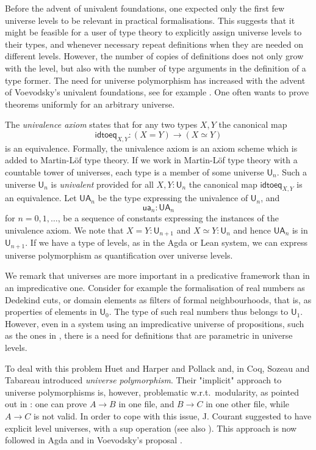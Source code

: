 \documentclass[11pt,a4paper]{article}
\theoremstyle{definition}
\newcommand{\UU}{\mathsf{U}}
\newcommand{\Level}{\mathsf{Level}}
\newcommand{\idtoeq}{\mathsf{idtoeq}}
\newcommand{\ua}{\mathsf{ua}}
\newcommand{\UA}{\mathsf{UA}}
\begin{document}
Before the advent of univalent foundations, one expected only the first few universe
levels to be relevant in practical formalisations. This suggests that it might be feasible
for a user of type theory to explicitly assign universe levels to their types, and whenever necessary
repeat definitions when they are needed on different levels. However, the number of copies of definitions
does not only grow with the level, but also with the number of type arguments in the definition of a type former.
The need for universe polymorphism has increased with the advent of Voevodsky's univalent foundations,
see for example \cite{VV}. One often wants to prove theorems uniformly for an arbitrary universe.

The {\em univalence axiom} states that for any two types $X,Y$ the canonical map
$$
\idtoeq_{X,Y} : (X=Y)\to (X\simeq Y)
$$
is an equivalence.
Formally, the univalence axiom is an axiom scheme which is added to Martin-Löf type theory. If we work in Martin-Löf type theory with a countable tower of universes, each type is a member of some universe $\UU_n$. Such a universe $\UU_n$ is {\em univalent} provided for all $X,Y : \UU_n$ the canonical map $\idtoeq_{X,Y}$ is an equivalence. Let $\UA_n$ be the type expressing the univalence of $\UU_n$, and
$$
\ua_n : \UA_n
$$
for $n = 0,1,\ldots$, be a sequence of constants expressing the instances of the univalence axiom. We note that $X = Y : \UU_{n+1}$ and $X\simeq Y : \UU_n$ and hence $\UA_n$ is in $\UU_{n+1}$.
If we have a type of levels, as in the Agda or Lean system,
we can express universe polymorphism as quantification over universe levels.

We remark that universes are more important in a predicative framework than in an impredicative one.
Consider for example the formalisation of real numbers as Dedekind cuts, or domain elements as filters of formal neighbourhoods, that is, as properties of elements in $\UU_0$. The type of such real numbers thus belongs to $\UU_1$.
However, even in a system using an impredicative universe of propositions,
such as the ones in \cite{Huet87,moura:lean}, there is a need for definitions that are parametric
in universe levels.


 To deal with this problem Huet \cite{Huet87} and
 Harper and Pollack \cite{HarperP91} and, in Coq, Sozeau and Tabareau
 \cite{SozeauTabareau:coq} introduced \emph{universe polymorphism}.
 Their "implicit" approach to universe polymorphisms is, however,
 problematic w.r.t.\ modularity, as pointed out in \cite{Courant02,Simpson04}:
 one can prove $A\rightarrow B$ in one file, and $B\rightarrow C$ in
 one other file, while $A\rightarrow C$ is not valid.
 In order to cope with this issue, J. Courant \cite{Courant02}
 suggested to have explicit level universes, with a sup operation
 (see also \cite{herbelin05}).
 This approach is now followed in Agda and in Voevodsky's proposal \cite{VV}.
\end{document}
